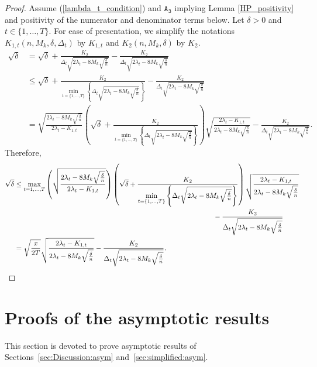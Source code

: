 \documentclass[twoside,11pt]{article}
\newcommand{\nb}{n}
\newcommand{\A}[1]{$\mathtt{A_#1}$}
\begin{document}
\begin{proof}
Assume (\ref{lambda_t_condition}) and \A{3} implying Lemma \ref{HP_positivity} and positivity of the numerator and denominator terms below.
Let $\delta>0$ and $t \in \{1,\ldots,T\}$. 
For ease of presentation, we simplify the notations $K_{1,t}\left(\nb,M_k,\delta,\Delta_t \right)$ by $K_{1,t}$ and $K_2 \left( \nb,M_k,\delta \right)$ by $K_2$. 
\begin{align*}
    \sqrt{\delta} &= \sqrt{\delta} + \frac{K_2}{\Delta_t \sqrt{2\lambda_t - 8 M_k \sqrt{\frac{\delta}{\nb}}}} - \frac{K_2}{\Delta_t \sqrt{2\lambda_t - 8 M_k \sqrt{\frac{\delta}{\nb}}}} \\
    &\leq \sqrt{\delta} + \frac{K_2}{\underset{t=\{1,\ldots,T\}}{\min} \left\{\Delta_t \sqrt{2\lambda_t - 8 M_k \sqrt{\frac{\delta}{\nb}}} \right\}} - \frac{K_2}{\Delta_t \sqrt{2\lambda_t - 8 M_k \sqrt{\frac{\delta}{\nb}}}} \\
    & = \sqrt{\frac{2\lambda_t - 8 M_k \sqrt{\frac{\delta}{\nb}}}{2\lambda_t - K_{1,t} }} \left(\sqrt{\delta} + \frac{K_2}{\underset{t=\{1,\ldots,T\}}{\min} \left\{\Delta_t \sqrt{2\lambda_t - 8 M_k \sqrt{\frac{\delta}{\nb}}} \right\}} \right) \sqrt{\frac{2\lambda_t - K_{1,t} }{2\lambda_t - 8 M_k \sqrt{\frac{\delta}{\nb}}}}  - \frac{K_2}{\Delta_t \sqrt{2\lambda_t - 8 M_k \sqrt{\frac{\delta}{\nb}}}}.
    \end{align*}
    Therefore,
   \begin{align*}
    \sqrt{\delta}&\leq \underset{t=1,\ldots,T}{\max}  \left(\sqrt{\frac{2\lambda_t - 8 M_k \sqrt{\frac{\delta}{\nb}}}{2\lambda_t - K_{1,t} }}  \right) \left(\sqrt{\delta} + \frac{K_2}{\underset{t=\{1,\ldots,T\}}{\min} \left\{\Delta_t \sqrt{2\lambda_t - 8 M_k \sqrt{\frac{\delta}{\nb}}} \right\}} \right) \sqrt{\frac{2\lambda_t - K_{1,t} }{2\lambda_t - 8 M_k \sqrt{\frac{\delta}{\nb}}}} \\
    & \hspace{10 cm} - \frac{K_2}{\Delta_t \sqrt{2\lambda_t - 8 M_k \sqrt{\frac{\delta}{\nb}}}} \\
    & = \sqrt{\frac{x}{2T}} \sqrt{\frac{2\lambda_t - K_{1,t} }{2\lambda_t - 8 M_k \sqrt{\frac{\delta}{\nb}}}} - \frac{K_2}{\Delta_t \sqrt{2\lambda_t - 8 M_k \sqrt{\frac{\delta}{\nb}}}}.
\end{align*}
\normalsize
\end{proof}
\section{Proofs of the asymptotic results}\label{la_section_proof_asympt}
This section is devoted to prove asymptotic results of Sections~\ref{sec:Discussion:asym} and~\ref{sec:simplified:asym}. 
\end{document}

